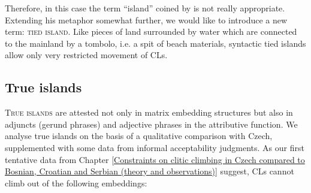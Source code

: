 \noindent Therefore, in this case the term ``island'' coined by \citet[][]{Ross67} is not really appropriate. Extending his metaphor somewhat further, we would like to introduce a new term: \textsc{tied island}. Like pieces of land surrounded by water which are connected to the mainland by a tombolo, i.e. a spit of beach materials, syntactic tied islands allow only very restricted movement of CLs. 

\subsection{True islands}
\label{True islands}

\textsc{True islands} are attested not only in matrix embedding structures but also in adjuncts (gerund phrases) and adjective phrases in the attributive function. We analyse true islands on the basis of a qualitative comparison with Czech, supplemented with some data from informal acceptability judgments. As our first tentative data from Chapter \ref{Constraints on clitic climbing in Czech compared to Bosnian, Croatian and Serbian (theory and observations)} suggest, CLs cannot climb out of the following embeddings:

